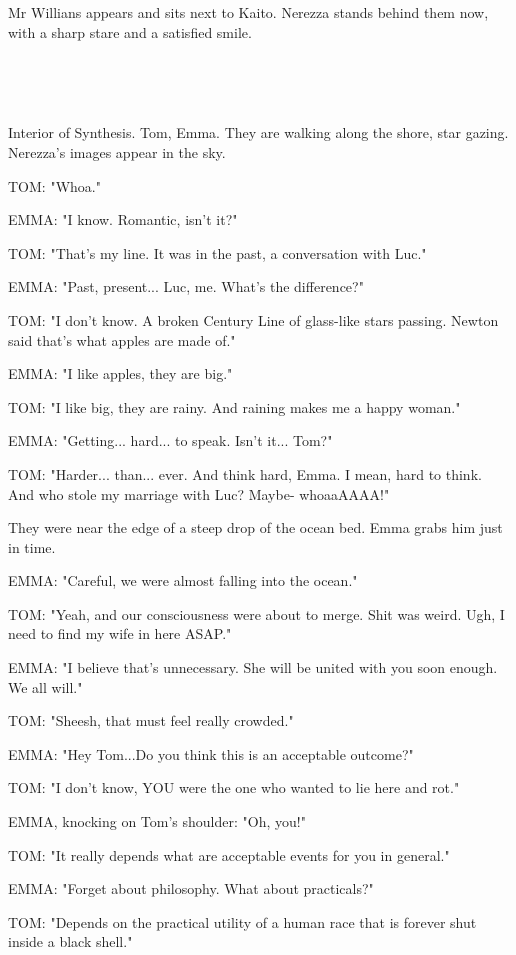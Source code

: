 \documentclass[11pt]{article}
\begin{document}
Mr Willians appears and sits next to Kaito.
Nerezza stands behind them now, with a sharp stare and a satisfied smile.

\ 

\ 

Interior of Synthesis.
Tom, Emma.
They are walking along the shore, star gazing.
Nerezza's images appear in the sky.

TOM: "Whoa."

EMMA: "I know. Romantic, isn't it?"

TOM: "That's my line.
It was in the past, a conversation with Luc."

EMMA: "Past, present... Luc, me. What's the difference?"

TOM: "I don't know. 
A broken Century Line of glass-like stars passing.
Newton said that's what apples are made of."

EMMA: "I like apples, they are big."

TOM: "I like big, they are rainy.
And raining makes me a happy woman."

EMMA: "Getting... hard... to speak. 
Isn't it... Tom?"

TOM: "Harder... than... ever.
And think hard, Emma.
I mean, hard to think.
And who stole my marriage with Luc?
Maybe- whoaaAAAA!"

They were near the edge of a steep drop of the ocean bed. 
Emma grabs him just in time.

EMMA: "Careful, we were almost falling into the ocean."

TOM: "Yeah, and our consciousness were about to merge. 
Shit was weird.
Ugh, I need to find my wife in here ASAP."

EMMA: "I believe that's unnecessary. 
She will be united with you soon enough.
We all will."

TOM: "Sheesh, that must feel really crowded."

EMMA: "Hey Tom...Do you think this is an acceptable outcome?"

TOM: "I don't know, YOU were the one who wanted to lie here and rot."

EMMA, knocking on Tom's shoulder: "Oh, you!"

TOM: "It really depends what are acceptable events for you in general."

EMMA: "Forget about philosophy.
What about practicals?"

TOM: "Depends on the practical utility of a human race that is forever shut inside a black shell."
\end{document}
